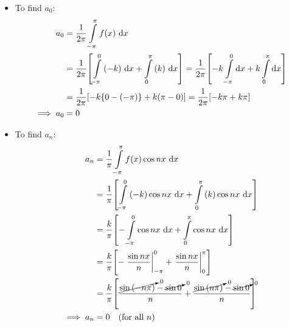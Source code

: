         \begin{itemize}
            \item To find $a_0$:
            \begin{align*}
                a_0&=\dfrac{1}{2\pi}\int\limits_{-\pi}^{\pi}{f(x)\,\dd{x}} \\
                    &=\dfrac{1}{2\pi}\qty[\int\limits_{-\pi}^{0}{(-k)\,\dd{x}}+\int\limits_{0}^{\pi}{(k)\,\dd{x}}]=\dfrac{1}{2\pi}\qty[-k\int\limits_{-\pi}^{0}{\dd{x}}+k\int\limits_{0}^{\pi}{\dd{x}}]\\
                    &=\dfrac{1}{2\pi}\qty[-k\qty{0-(-\pi)}+k(\pi-0)]=\dfrac{1}{2\pi}\qty[-k\pi+k\pi] \\
                \implies a_0&=0
            \end{align*}

            \item To find $a_n$:
            \begin{align*}
                a_n&=\dfrac{1}{\pi}\int\limits_{-\pi}^{\pi}{f(x)\cos{nx}\,\dd{x}} \\
                    &=\dfrac{1}{\pi}\qty[\int\limits_{-\pi}^{0}{(-k)\cos{nx}\,\dd{x}}+\int\limits_{0}^{\pi}{(k)\cos{nx}\,\dd{x}}] \\
                    &=\dfrac{k}{\pi}\qty[-\int\limits_{-\pi}^{0}{\cos{nx}\,\dd{x}}+\int\limits_{0}^{\pi}{\cos{nx}\,\dd{x}}] \\
                    &=\dfrac{k}{\pi}\qty[-\left.\dfrac{\sin{nx}}{n}\right|_{-\pi}^{0}+\left.\dfrac{\sin{nx}}{n}\right|_{0}^{\pi}] \\
                    &=\dfrac{k}{\pi}\qty[\dfrac{\cancelto{0}{\sin{(-n\pi)}}-\cancelto{0}{\sin{0}}}{n}+\dfrac{\cancelto{0}{\sin{(n\pi)}}-\cancelto{0}{\sin{0}}}{n}] \\
                \implies a_n&=0\qq{(for all $n$)}
            \end{align*}


\end{itemize}
